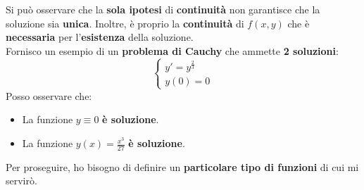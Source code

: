 \documentclass[a4paper, oneside]{article}
\begin{document}
    \noindent Si può osservare che la \textbf{sola ipotesi} di \textbf{continuità} non garantisce che la soluzione sia \textbf{unica}. 
    Inoltre, è proprio la \textbf{continuità} di $f(x,y)$ che è \textbf{necessaria} per l'\textbf{esistenza} della soluzione.\\
    Fornisco un esempio di un \textbf{problema di Cauchy} che ammette \textbf{2 soluzioni}:
    \[\begin{cases}
        y'=y^{\frac{2}{3}} \\
        y(0)=0
    \end{cases}\]
    Posso osservare che:\begin{itemize}
        \item La funzione $y\equiv 0$ \textbf{è soluzione}. 
        \item La funzione $y(x)=\frac{x^3}{27}$ \textbf{è soluzione}.
    \end{itemize}
    Per proseguire, ho bisogno di definire un \textbf{particolare tipo di funzioni} di cui mi servirò. 
\end{document}
